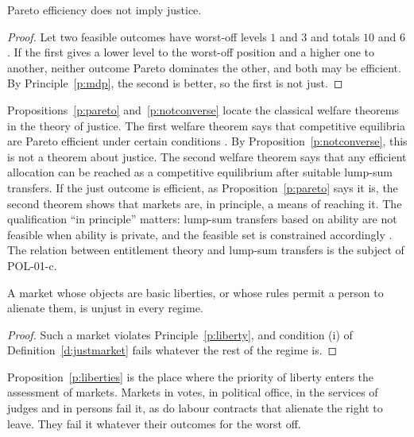 \documentclass{situationist-preprint}
\begin{document}
\begin{proposition}\label{p:notconverse}
Pareto efficiency does not imply justice.
\end{proposition}

\begin{proof}
Let two feasible outcomes have worst-off levels $1$ and $3$ and totals $10$ and $6$. If the first gives a lower level to the worst-off position and a higher one to another, neither outcome Pareto dominates the other, and both may be efficient. By Principle~\ref{p:mdp}, the second is better, so the first is not just.
\end{proof}

Propositions~\ref{p:pareto} and~\ref{p:notconverse} locate the classical welfare theorems in the theory of justice. The first welfare theorem says that competitive equilibria are Pareto efficient under certain conditions \citep{Arrow1951,Debreu1959}. By Proposition~\ref{p:notconverse}, this is not a theorem about justice. The second welfare theorem says that any efficient allocation can be reached as a competitive equilibrium after suitable lump-sum transfers. If the just outcome is efficient, as Proposition~\ref{p:pareto} says it is, the second theorem shows that markets are, in principle, a means of reaching it. The qualification \enquote{in principle} matters: lump-sum transfers based on ability are not feasible when ability is private, and the feasible set is constrained accordingly \citep{Mirrlees1971}. The relation between entitlement theory and lump-sum transfers is the subject of POL-01-c.

\begin{proposition}\label{p:liberties}
A market whose objects are basic liberties, or whose rules permit a person to alienate them, is unjust in every regime.
\end{proposition}

\begin{proof}
Such a market violates Principle~\ref{p:liberty}, and condition (i) of Definition~\ref{d:justmarket} fails whatever the rest of the regime is.
\end{proof}

Proposition~\ref{p:liberties} is the place where the priority of liberty enters the assessment of markets. Markets in votes, in political office, in the services of judges and in persons fail it, as do labour contracts that alienate the right to leave. They fail it whatever their outcomes for the worst off.
\end{document}
